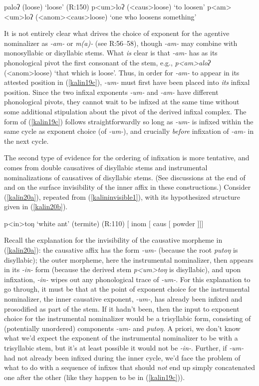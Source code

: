 \documentclass[output=paper]{langscibook}
\begin{document}
\ea
\ea paloʔ (loose) \hfill `loose' (R:150)
\ex p<um>loʔ ({\sc <caus>}loose) \hfill `to loosen'
\ex p<am><um>loʔ ({\sc <anom><caus>}loose) \hfill `one who loosens something'\label{kalin19c}
\z
\z

\noindent It is not entirely clear what drives the choice of exponent for the agentive nominalizer as \textit{-am-} or \textit{m(a)-} (see R:56--58), though \textit{-am-} may combine with monosyllabic or disyllabic stems. What {\it is} clear is that \textit{-am-} has as its phonological pivot the first consonant of the stem, e.g.,  \textit{p<am>aloʔ} ({\sc <anom>}loose) `that which is loose'. Thus, in order for \textit{-am-} to appear in its attested position in (\ref{kalin19c}), \textit{-um-} must first have been placed into {\it its} infixal position. Since the two infixal exponents \textit{-um-} and \textit{-am-} have different phonological pivots, they cannot wait to be infixed at the same time without some additional stipulation about the pivot of the derived infixal complex. The form of (\ref{kalin19c}) follows straightforwardly so long as \textit{-um-} is infixed within the same cycle as exponent choice (of \textit{-um-}), and crucially {\it before} infixation of \textit{-am-} in the next cycle.

The second type of evidence for the ordering of infixation  is more tentative, and comes from double causatives of disyllabic stems and instrumental nominalizations of causatives of disyllabic stems. (See discussions at the end of  and  on the surface invisibility of the inner affix in these constructions.) Consider (\ref{kalin20a}), repeated from (\ref{kalininvisible1}), with its hypothesized structure given in (\ref{kalin20b}).

\ea
\ea p<in>toŋ \hfill `white ant' (termite) (R:110)\label{kalin20a}
\ex $[$ {\sc  inom $[$ caus} $[$ powder $]$$]$$]$\label{kalin20b}
\z
\z

\noindent Recall the explanation for the invisibility of the causative morpheme in (\ref{kalin20a}): the causative affix has the form \textit{-um-} (because the root \textit{putoŋ} is disyllabic); the outer morpheme, here the instrumental nominalizer, then appears in its \textit{-in-} form (because the derived stem \textit{p<um>toŋ} is disyllabic), and upon infixation, \textit{-in-} wipes out any phonological trace of \textit{-um-}. For this explanation to go through, it must be that at the point of exponent choice for the instrumental nominalizer, the inner causative exponent, \textit{-um-}, has already been infixed and prosodified as part of the stem. If it hadn't been, then the input to exponent choice for the instrumental nominalizer would be a trisyllabic form, consisting of (potentially unordered) components \textit{-um-} and  \textit{putoŋ}. A priori, we don't know what we'd expect the exponent of the instrumental nominalizer to be with a trisyllabic stem, but it's at least possible it would not be \textit{-in-}. Further, if \textit{-um-} had not already been infixed during the inner cycle, we'd face the problem of what to do with a sequence of infixes that should \textit{not} end up simply concatenated one after the other (like they happen to be in (\ref{kalin19c})).
\end{document}
